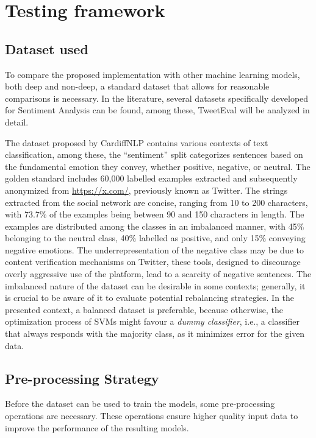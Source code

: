 \chapter{Testing framework}

\section{Dataset used}\label{sec:dataset}

To compare the proposed implementation with other machine learning models, both deep and non-deep, a standard dataset that allows for reasonable comparisons is necessary. In the literature, several datasets specifically developed for Sentiment Analysis can be found, among these, TweetEval\cite{tweeteval} will be analyzed in detail.

The dataset proposed by CardiffNLP contains various contexts of text classification, among these, the ``sentiment'' split categorizes sentences based on the fundamental emotion they convey, whether positive, negative, or neutral. The golden standard includes 60,000 labelled examples extracted and subsequently anonymized from \url{https://x.com/}, previously known as Twitter. The strings extracted from the social network are concise, ranging from 10 to 200 characters, with 73.7\% of the examples being between 90 and 150 characters in length. The examples are distributed among the classes in an imbalanced manner, with 45\% belonging to the neutral class, 40\% labelled as positive, and only 15\% conveying negative emotions. The underrepresentation of the negative class may be due to content verification mechanisms on Twitter, these tools, designed to discourage overly aggressive use of the platform, lead to a scarcity of negative sentences. The imbalanced nature of the dataset can be desirable in some contexts; generally, it is crucial to be aware of it to evaluate potential rebalancing strategies. In the presented context, a balanced dataset is preferable, because otherwise, the optimization process of SVMs might favour a \emph{dummy classifier}, i.e., a classifier that always responds with the majority class, as it minimizes error for the given data.

\section{Pre-processing Strategy}

Before the dataset can be used to train the models, some pre-processing operations are necessary. These operations ensure higher quality input data to improve the performance of the resulting models.

